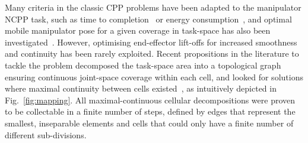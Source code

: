 \documentclass[conference]{IEEEtran}
\begin{document}
Many criteria in the classic CPP problems have been adapted to the manipulator NCPP task, such as time to completion~\cite{lu2020time} or energy consumption~\cite{mei2004energy}, and optimal mobile manipulator pose for a given coverage in task-space has also been investigated~\cite{paus2017a}. However, optimising  end-effector lift-offs for increased smoothness and continuity has been rarely exploited. %
Recent propositions in the literature to tackle the problem decomposed the task-space area into a %
topological graph ensuring continuous joint-space coverage within each cell, and looked for solutions where maximal continuity between cells existed~\cite{Yang2020Cellular}, as intuitively depicted in Fig.~\ref{fig:mapping}. 
All maximal-continuous cellular decompositions were proven to be collectable in a finite number of steps, defined by edges that represent the smallest, inseparable elements and cells that could only have a finite number of different sub-divisions.  

\end{document}
